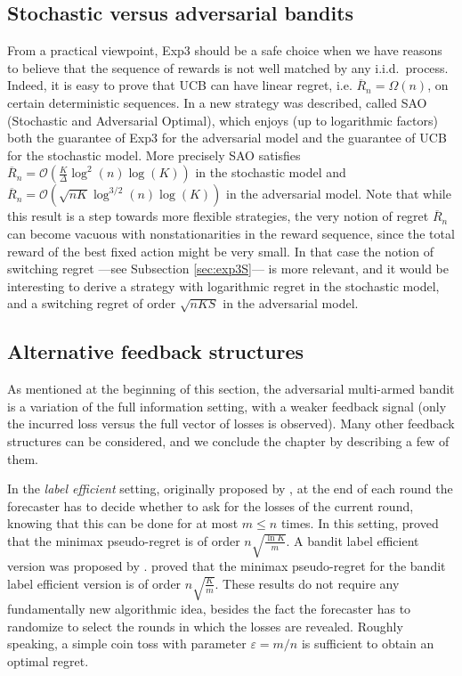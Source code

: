 \documentclass[11pt]{hackednow}
\newcommand{\oR}{\overline{R}}
\renewcommand{\epsilon}{\varepsilon}
\begin{document}
\subsection{Stochastic versus adversarial bandits} \label{sec:best-of-both}
From a practical viewpoint, Exp3 should be a safe choice when we have reasons to believe that the sequence of rewards is not well matched by any i.i.d.\ process. Indeed, it is easy to prove that UCB can have linear regret, i.e. $\oR_n = \Omega(n)$, on certain deterministic sequences. In \cite{BS12} a new strategy was described, called SAO (Stochastic and Adversarial Optimal), which enjoys (up to logarithmic factors) both the guarantee of Exp3 for the adversarial model and the guarantee of UCB for the stochastic model. More precisely SAO satisfies $\oR_n = \mathcal{O} \left(\frac{K}{\Delta} \log^2(n) \log(K) \right)$ in the stochastic model and $\oR_n = \mathcal{O} \left( \sqrt{n K} \log^{3/2}(n) \log(K) \right)$ in the adversarial model. Note that while this result is a step towards more flexible strategies, the very notion of regret $\oR_n$ can become vacuous with nonstationarities in the reward sequence, since the total reward of the best fixed action might be very small. In that case the notion of switching regret ---see Subsection \ref{sec:exp3S}--- is more relevant, and it would be interesting to derive a strategy with logarithmic regret in the stochastic model, and a switching regret of order $\sqrt{n K S}$ in the adversarial model.




\subsection{Alternative feedback structures} \label{sec:feedback}
As mentioned at the beginning of this section, the adversarial multi-armed bandit is a variation of the full information setting, with a weaker feedback signal (only the incurred loss versus the full vector of losses is observed). Many other feedback structures can be considered, and we conclude the chapter by describing a few of them.

In the {\em label efficient} setting, originally proposed by \cite{HP97}, at the end of each round the forecaster has to decide whether to ask for the losses of the current round, knowing that this can be done for at most $m \leq n$ times. In this setting, \cite{CLS05} proved that the minimax pseudo-regret is of order $n \sqrt{\frac{\ln K}{m}}$. A bandit label efficient version was proposed by \cite{AAGO06}. \cite{AB10} proved that the minimax pseudo-regret for the bandit label efficient version is of order $n \sqrt{\frac{K}{m}}$. These results do not require any fundamentally new algorithmic idea, besides the fact the forecaster has to randomize to select the rounds in which the losses are revealed. Roughly speaking, a simple coin toss with parameter $\epsilon = m/n$ is sufficient to obtain an optimal regret.
\end{document}
